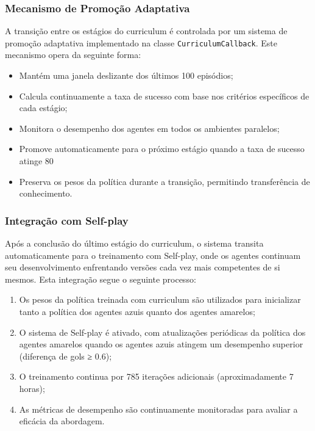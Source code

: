 \subsubsection{Mecanismo de Promoção Adaptativa}

A transição entre os estágios do curriculum é controlada por um sistema de promoção adaptativa implementado na classe \texttt{CurriculumCallback}. Este mecanismo opera da seguinte forma:

\begin{itemize}
    \item Mantém uma janela deslizante dos últimos 100 episódios;
    \item Calcula continuamente a taxa de sucesso com base nos critérios específicos de cada estágio;
    \item Monitora o desempenho dos agentes em todos os ambientes paralelos;
    \item Promove automaticamente para o próximo estágio quando a taxa de sucesso atinge 80%
    \item Preserva os pesos da política durante a transição, permitindo transferência de conhecimento.
\end{itemize}

\subsubsection{Integração com Self-play}

Após a conclusão do último estágio do curriculum, o sistema transita automaticamente para o treinamento com Self-play, onde os agentes continuam seu desenvolvimento enfrentando versões cada vez mais competentes de si mesmos. Esta integração segue o seguinte processo:

\begin{enumerate}
    \item Os pesos da política treinada com curriculum são utilizados para inicializar tanto a política dos agentes azuis quanto dos agentes amarelos;
    \item O sistema de Self-play é ativado, com atualizações periódicas da política dos agentes amarelos quando os agentes azuis atingem um desempenho superior (diferença de gols ≥ 0.6);
    \item O treinamento continua por 785 iterações adicionais (aproximadamente 7 horas);
    \item As métricas de desempenho são continuamente monitoradas para avaliar a eficácia da abordagem.
\end{enumerate}

